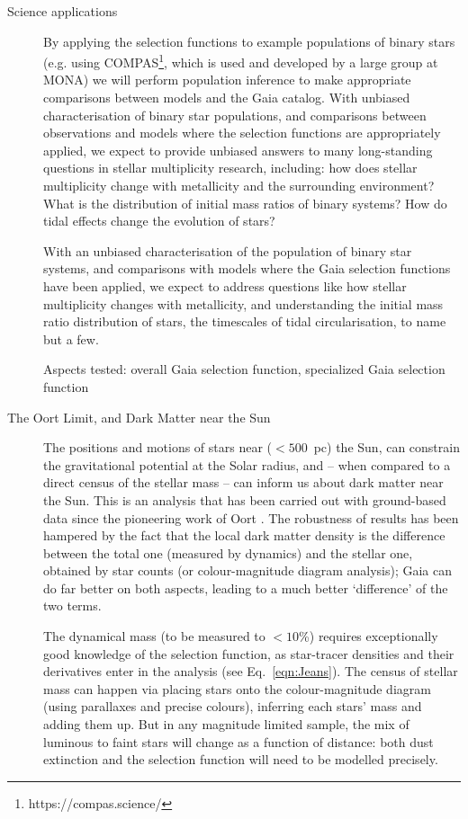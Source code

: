 \begin{workpackage}{Science applications}
\begin{wpobjectives}
\begin{description}
{        By applying the selection functions to example populations of binary stars (e.g. using COMPAS\footnote{https://compas.science/}, which is used and developed by a large group at MONA) we will perform population inference to make appropriate comparisons between models and the Gaia catalog. With unbiased characterisation of binary star populations, and comparisons between observations and models where the selection functions are appropriately applied, we expect to provide unbiased answers to many long-standing questions in stellar multiplicity research, including: how does stellar multiplicity change with metallicity and the surrounding environment? What is the distribution of initial mass ratios of binary systems? How do tidal effects change the evolution of stars? 

        With an unbiased characterisation of the population of binary star systems, and comparisons with models where the Gaia selection functions have been applied, we expect to address questions like how stellar multiplicity changes with metallicity, and understanding the initial mass ratio distribution of stars, the timescales of tidal circularisation, to name but a few.
        
        \textsf{Aspects tested: overall Gaia selection function, specialized Gaia selection function}
        }
      
      \item[The Oort Limit, and Dark Matter near the Sun]{
        The positions and motions of stars near ($<500$~pc) the Sun, can constrain the gravitational potential at the Solar radius, and -- when compared to a direct census of the stellar mass -- can inform us about dark matter near the Sun. This is an analysis that has been carried out with ground-based data since the pioneering work of Oort \citep[e.g.][]{Read2014}. The robustness of results has been hampered by the fact that the local dark matter density is the difference between the total one (measured by dynamics) and the stellar one, obtained by star counts (or colour-magnitude diagram analysis); Gaia can do far better on both aspects, leading to a much better `difference' of the two terms. 
      
        The dynamical mass (to be measured to $<10$\%) requires exceptionally good knowledge of the selection function, as star-tracer densities and their derivatives enter in the analysis (see Eq.~\ref{eqn:Jeans}). The census of stellar mass can happen via placing stars onto the colour-magnitude diagram (using parallaxes and precise colours), inferring each stars' mass and adding them up. But in any magnitude limited sample, the mix of luminous to faint stars will change as a function of distance: both dust extinction and the selection function will need to be modelled precisely. 
      
}
\end{description}
\end{wpobjectives}
\end{workpackage}
